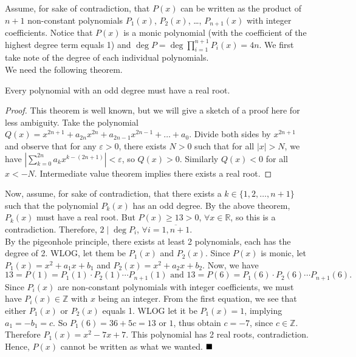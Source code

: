\documentclass[11pt]{article}
\newcommand{\divides}{\mid}
\newenvironment{solution}[1][Solution]{%
  \proof[\normalfont \faPenNib \hspace{0.2cm} \ttfamily \scshape \large #1]%
}{\(\hfill \blacksquare\){\parfillskip0pt\par}}
\theoremstyle{definition}
\begin{document}
        \begin{solution}
            Assume, for sake of contradiction, that \(P(x)\) can be written as the product of \(n + 1\) non-constant polynomials \(P_1(x)\), \(P_2(x)\), \dots, \(P_{n+1}(x)\) with integer coefficients. Notice that \(P(x)\) is a monic polynomial (with the coefficient of the highest degree term equals 1) and \(\deg P = \deg \prod\limits_{i=1}^{n+1}P_i(x) = 4n\). We first take note of the degree of each individual polynomials.\\
            We need the following theorem.

            \begin{claim}
                Every polynomial with an odd degree must have a real root.
            \end{claim}

            \begin{proof}
                This theorem is well known, but we will give a sketch of a proof here for less ambiguity. Take the polynomial \(Q(x) = x^{2n+1} + a_{2n}x^{2n} + a_{2n-1}x^{2n-1} + \dots + a_0\). Divide both sides by \(x^{2n+1}\) and observe that for any \(\varepsilon > 0\), there exists \(N > 0\) such that for all \(\left|x\right| > N\), we have \(\left|\sum\limits_{k=0}^{2n} a_kx^{k-(2n+1)}\right| < \varepsilon\), so \(Q(x) > 0\). Similarly \(Q(x) < 0\) for all \(x < -N\). Intermediate value theorem implies there exists a real root.
            \end{proof}

            Now, assume, for sake of contradiction, that there exists a \(k \in \{1,2,\dots,n+1\}\) such that the polynomial \(P_k(x)\) has an odd degree. By the above theorem, \(P_k(x)\) must have a real root. But \(P(x) \geq 13 > 0\), \(\forall x \in \mathbb{R}\), so this is a contradiction. Therefore, \(2 \divides \deg P_i\), \(\forall i = \overline{1,n+1}\).\\
            By the pigeonhole principle, there exists at least 2 polynomials, each has the degree of 2. WLOG, let them be \(P_1(x)\) and \(P_2(x)\). Since \(P(x)\) is monic, let \(P_1(x) = x^2 + a_1x + b_1\) and \(P_2(x) = x^2 + a_2x + b_2\). Now, we have
            \[13 = P(1) = P_1(1) \cdot P_2(1) \cdots P_{n+1}(1) \text{ \ and \ } 13 = P(6) = P_1(6) \cdot P_2(6) \cdots P_{n+1}(6).\]
            Since \(P_i(x)\) are non-constant polynomials with integer coefficients, we must have \(P_i(x) \in \mathbb{Z}\) with \(x\) being an integer. From the first equation, we see that either \(P_1(x)\) or \(P_2(x)\) equals 1. WLOG let it be \(P_1(x) = 1\), implying \(a_1 = -b_1 = c\). So \(P_1(6) = 36 + 5c = 13\) or \(1\), thus obtain \(c = -7\), since \(c \in \mathbb{Z}\). Therefore \(P_1(x) = x^2 - 7x + 7\). This polynomial has 2 real roots, contradiction.\\
            Hence, \(P(x)\) cannot be written as what we wanted.
        \end{solution}
\end{document}
